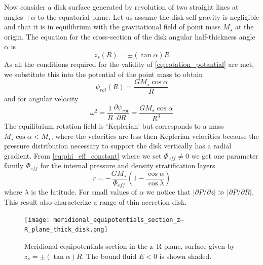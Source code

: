 \documentclass[a4paper,modern]{aastex62}
\begin{document}
Now consider a disk surface generated by revolution of two straight lines at angles $\pm\alpha$ to the equatorial plane. Let us assume the disk self gravity is negligible and that it is in equilibrium with the gravitational field of point mass $M_\star$ at the origin.
The equation for the cross-section of the disk angular half-thickness angle $\alpha$ is
\begin{equation}
z_s(R)=\pm(\tan\alpha)R
\end{equation}
As all the conditions required for the validity of \ref{eq:rotation_potantial} are met, we substitute this into the potential of the point mass to obtain
\begin{equation}
    \psi_{rot}(R)=\frac{GM_\star \cos \alpha}{R}
\end{equation}
and for angular velocity 
\begin{equation}\label{eq:angular_velocity}
    \omega^2=\frac{1}{R}\frac{\partial \psi_{rot}}{\partial R} = \frac{GM_\star\cos\alpha}{R^3}
\end{equation}
The equilibrium rotation field is `Keplerian' but corresponds to a mass $M_\star\cos\alpha<M_\star$, where the velocities are less then Keplerian velocities because the pressure distribution necessary to support the disk vertically has a radial gradient. From \ref{eq:phi_eff_constant} where we set $\Phi_{eff}\neq0$ we get one parameter family $\Phi_{eff}$ for the internal pressure and density stratification layers
\begin{equation}
    r= - \frac{GM_\star}{\Phi_{eff}}
    \left(1- \frac{\cos\alpha}{\cos\lambda} \right)
\end{equation}
where $\lambda$ is the latitude. 
For small values of $\alpha$ we notice that $|\partial P/\partial z| \gg |\partial P/\partial R|$. This result also characterize a range of thin accretion disk.
\begin{figure}[ht!]
\texttt{[image: meridional\_equipotentials\_section\_z–R\_plane\_thick\_disk.png]}
\caption{Meridional equipotentials section in the z–R plane, surface given
by $z_s=\pm(\tan \alpha)R$. The bound fluid $E < 0$ is shown shaded.}
\label{fig:thick-disk-tori-struct}
\end{figure}
\end{document}
